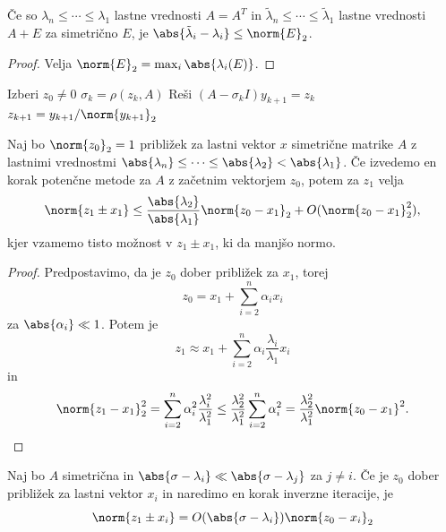 \begin{posledica}
  Če so $\lambda_n \le \cdots \le \lambda_1$ lastne vrednosti $A = A^T$ in
  $\tilde{\lambda}_n \le \cdots \le \tilde{\lambda}_1$ lastne vrednosti $A + E$
  za simetrično $E$, je $\abs{\tilde{\lambda}_i - \lambda_i} \le \norm{E}_2$.
\end{posledica}

\begin{proof}
  Velja $\norm{E}_2 = \max_i \abs{\lambda_i(E)}$.
\end{proof}



\begin{algorithm}
  \caption{Rayleighova iteracija}
  \label{alg:rayleighova-iteracija}
  \begin{algorithmic}
	\State Izberi $z_0 \ne 0$
	\State $\sigma_k = \rho(z_k, A)$
	\State Reši $(A - \sigma_k I) y_{k+1} = z_k$
	\State $z_{k+1} = y_{k+1} / \norm{y_{k+1}}_2$
	\EndFor
  \end{algorithmic}
\end{algorithm}

\begin{lema}
  Naj bo $\norm{z_0}_2 = 1$ približek za lastni vektor $x$ simetrične matrike
  $A$ z lastnimi vrednostmi $\abs{\lambda_n} \le \cdots \le \abs{\lambda_2} <
  \abs{\lambda_1}$.
  Če izvedemo en korak potenčne metode za $A$ z začetnim vektorjem $z_0$, potem
  za $z_1$ velja
  \[
	\norm{z_1 \pm x_1} \le \frac{\abs{\lambda_2}}{\abs{\lambda_1}} \norm{z_0 -
	  x_1}_2 + O(\norm{z_0 - x_1}_2^2),
  \]
  kjer vzamemo tisto možnost v $z_1 \pm x_1$, ki da manjšo normo.
\end{lema}

\begin{proof}
  Predpostavimo, da je $z_0$ dober približek za $x_1$, torej
  \[
	z_0 = x_1 + \sum_{i=2}^n \alpha_i x_i
  \]
  za $\abs{\alpha_i} \ll 1$.
  Potem je
  \[
	z_1 \approx x_1 + \sum_{i=2}^n \alpha_i \frac{\lambda_i}{\lambda_1} x_i
  \]
  in
  \[
	\norm{z_1 - x_1}_2^2 = \sum_{i=2}^n \alpha_i^2
	\frac{\lambda_i^2}{\lambda_1^2}
	\le \frac{\lambda_2^2}{\lambda_1^2} \sum_{i=2}^n \alpha_i^2
	= \frac{\lambda_2^2}{\lambda_1^2} \norm{z_0 - x_1}^2.
  \]
\end{proof}


\begin{posledica}
  Naj bo $A$ simetrična in $\abs{\sigma - \lambda_i} \ll \abs{\sigma -
	\lambda_j}$ za $j \ne i$.
  Če je $z_0$ dober približek za lastni vektor $x_i$ in naredimo en korak
  inverzne iteracije, je
  \[
	\norm{z_1 \pm x_i} = O(\abs{\sigma - \lambda_i}) \norm{z_0 - x_i}_2
  \]
\end{posledica}


